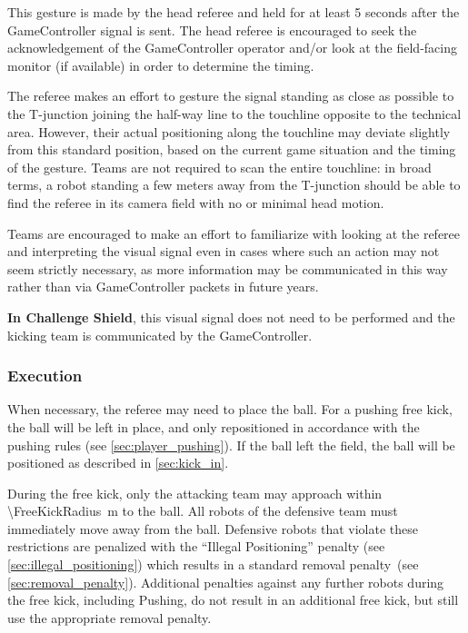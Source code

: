 This gesture is made by the head referee and held for at least 5 seconds after the GameController signal is sent.
The head referee is encouraged to seek the acknowledgement of the GameController operator and/or look at the field-facing monitor (if available) in order to determine the timing.

The referee makes an effort to gesture the signal standing as close as possible to the T-junction joining the half-way line to the touchline opposite to the technical area.
However, their actual positioning along the touchline may deviate slightly from this standard position, based on the current game situation and the timing of the gesture.
Teams are not required to scan the entire touchline:
in broad terms, a robot standing a few meters away from the T-junction should be able to find the referee in its camera field with no or minimal head motion.

Teams are encouraged to make an effort to familiarize with looking at the referee and interpreting the visual signal even in cases where such an action may not seem strictly necessary,
as more information may be communicated in this way rather than via GameController packets in future years.

\textbf{In Challenge Shield}, this visual signal does not need to be performed and the kicking team is communicated by the GameController.

\subsubsection{Execution}
\label{sec:free_kick_execution}

When necessary, the referee may need to place the ball.
For a pushing free kick, the ball will be left in place, and only repositioned in accordance with the pushing rules (see \cref{sec:player_pushing}).
If the ball left the field, the ball will be positioned as described in \cref{sec:kick_in}.

During the free kick, only the attacking team may approach within \qty{\FreeKickRadius}{\metre} to the ball.
All robots of the defensive team must immediately move away from the ball.
Defensive robots that violate these restrictions are penalized with the ``Illegal Positioning'' penalty (see \cref{sec:illegal_positioning}) which results in a standard removal penalty~(see \cref{sec:removal_penalty}).
Additional penalties against any further robots during the free kick, including Pushing, do not result in an additional free kick, but still use the appropriate removal penalty.

